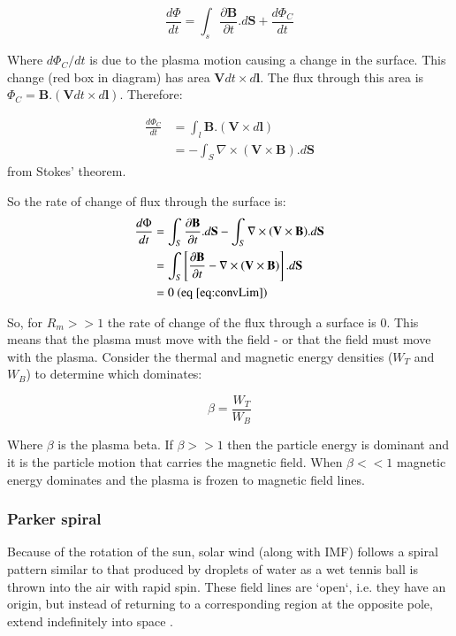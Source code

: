 \documentclass[12pt]{article}
\begin{document}
\begin{equation}
    \frac{d\Phi}{dt} = \int_s\frac{\partial\textbf{B}}{\partial t}.d\textbf{S} + \frac{d\Phi_C}{dt}
\end{equation}

Where $d\Phi_C/dt$ is due to the plasma motion causing a change in the surface.
This change (red box in diagram) has area $\textbf{V}dt\times d\textbf{l}$. The flux through this area is $\Phi_C=\textbf{B}.(\textbf{V}dt\times d\textbf{l})$. Therefore:

\begin{align}
    \frac{d\Phi_C}{dt}&=\int_l\textbf{B}.(\textbf{V}\times d\textbf{l}) \nonumber\\
    &=-\int_S\nabla\times(\textbf{V}\times\textbf{B}).d\textbf{S}
\end{align}
from Stokes' theorem.

So the rate of change of flux through the surface is:
\begin{align}
    \frac{d\Phi}{dt}&=\int_S\frac{\partial\textbf{B}}{\partial t}.d\textbf{S}-\int_S\nabla\times(\textbf{V}\times\textbf{B}).d\textbf{S} \nonumber\\
    &= \int_S\left[\frac{\partial\textbf{B}}{\partial t}-\nabla\times(\textbf{V}\times\textbf{B})\right].d\textbf{S} \nonumber\\
    &= 0\text{ (eq \ref{eq:convLim})}
\end{align}

So, for $R_m >> 1$ the rate of change of the flux through a surface is 0. This means that the plasma must move with the field - or that the field must move with the plasma. Consider the thermal and magnetic energy densities ($W_T$ and $W_B$) to determine which dominates:

\begin{equation}
    \beta=\frac{W_T}{W_B}
\end{equation}

Where $\beta$ is the plasma beta. If $\beta>>1$ then the particle energy is dominant and it is the particle motion that carries the magnetic field. When $\beta<<1$ magnetic energy dominates and the plasma is frozen to magnetic field lines.

\subsubsection{Parker spiral}

Because of the rotation of the sun, solar wind (along with IMF) follows a spiral pattern similar to that produced by droplets of water as a wet tennis ball is thrown into the air with rapid spin. These field lines are `open`, i.e. they have an origin, but instead of returning to a corresponding region at the opposite pole, extend indefinitely into space \cite{imfUptoLat16}. 
\end{document}
